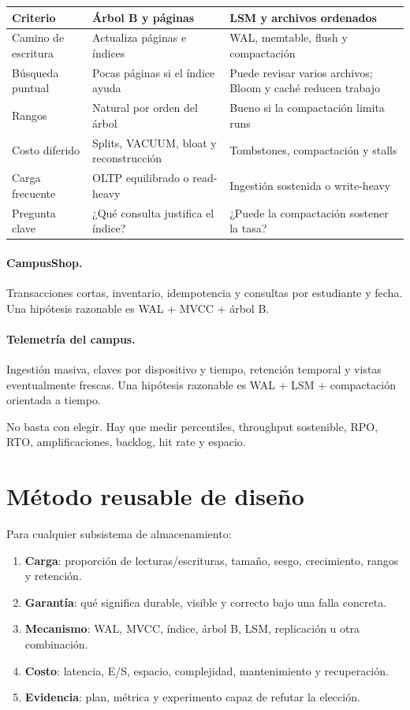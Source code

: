 \documentclass[variant=apuntes,cover=institutional,mode=screen]{ua-engineering-v6-article}
\begin{document}
\begin{center}
\begin{tabular}{p{}p{}p{}}
\toprule
Criterio & Árbol B y páginas & LSM y archivos ordenados \\
\midrule
Camino de escritura & Actualiza páginas e índices & WAL, memtable, flush y compactación \\
Búsqueda puntual & Pocas páginas si el índice ayuda & Puede revisar varios archivos; Bloom y caché reducen trabajo \\
Rangos & Natural por orden del árbol & Bueno si la compactación limita runs \\
Costo diferido & Splits, VACUUM, bloat y reconstrucción & Tombstones, compactación y stalls \\
Carga frecuente & OLTP equilibrado o read-heavy & Ingestión sostenida o write-heavy \\
Pregunta clave & ¿Qué consulta justifica el índice? & ¿Puede la compactación sostener la tasa? \\
\bottomrule
\end{tabular}
\end{center}

\paragraph{CampusShop.} Transacciones cortas, inventario, idempotencia y consultas por estudiante y fecha. Una hipótesis razonable es WAL + MVCC + árbol B.

\paragraph{Telemetría del campus.} Ingestión masiva, claves por dispositivo y tiempo, retención temporal y vistas eventualmente frescas. Una hipótesis razonable es WAL + LSM + compactación orientada a tiempo.

No basta con elegir. Hay que medir percentiles, throughput sostenible, RPO, RTO, amplificaciones, backlog, hit rate y espacio.

\section{Método reusable de diseño}

Para cualquier subsistema de almacenamiento:

\begin{enumerate}
\item \textbf{Carga}: proporción de lecturas/escrituras, tamaño, sesgo, crecimiento, rangos y retención.
\item \textbf{Garantía}: qué significa durable, visible y correcto bajo una falla concreta.
\item \textbf{Mecanismo}: WAL, MVCC, índice, árbol B, LSM, replicación u otra combinación.
\item \textbf{Costo}: latencia, E/S, espacio, complejidad, mantenimiento y recuperación.
\item \textbf{Evidencia}: plan, métrica y experimento capaz de refutar la elección.
\end{enumerate}
\end{document}
